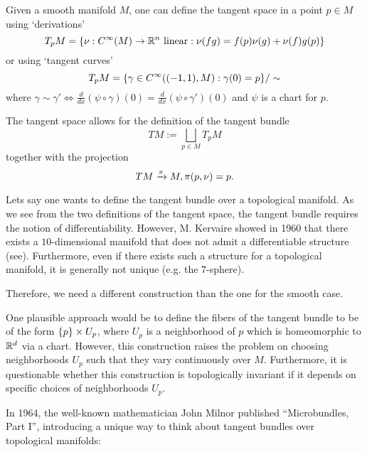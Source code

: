 \begin{myparagraph}
    
    Given a smooth manifold $M$,
    one can define the tangent space
    in a point $p \in M$ using `derivations'
    \[
        T_p M = \{\nu: C^\infty(M) \to \mathbb{R}^n \text{ linear}:\nu(fg)
        = f(p)\nu(g) + \nu(f)g(p)\}
    \]    
    or using `tangent curves'
    \[ T_p M = \{\gamma \in C^\infty((-1, 1), M):\gamma(0) = p \} / \sim \]
    where $\gamma \sim \gamma' \iff \frac{d}{dx}(\psi \circ \gamma)(0) = \frac{d}{dx}(\psi \circ \gamma')(0)$
    and $\psi$ is a chart for $p$.
    
    The tangent space allows for the definition of the tangent bundle
    \[ TM := \bigsqcup_{p \in M} T_p M\]
    together with the projection
    \[ TM \xrightarrow{\pi} M, \pi(p, \nu) = p. \]

    Lets say one wants to define the tangent bundle over a topological manifold.
    As we see from the two definitions of the tangent space,
    the tangent bundle requires the notion of differentiability.
    However, M. Kervaire showed in 1960 that there exists a $10$-dimensional manifold
    that does not admit a differentiable structure (see\cite{kervaire}).
    Furthermore, even if there exists such a structure for a topological manifold,
    it is generally not unique (e.g. the $7$-sphere\cite{milnor7sphere}).

    Therefore,
    we need a different construction than the one for the smooth case.
    
    One plausible approach would be to define the fibers of the tangent bundle
    to be of the form $\{p\} \times U_p$,
    where $U_p$ is a neighborhood of $p$ which is
    homeomorphic to $\mathbb{R}^d$ via a chart.
    However, this construction raises the problem
    on choosing neighborhoods $U_p$
    such that they vary continuously over $M$.
    Furthermore,
    it is questionable whether this construction is topologically
    invariant if it depends on specific choices of neighborhoods $U_p$.

    In 1964,
    the well-known mathematician John Milnor
    published ``Microbundles, Part I'',
    introducing a unique way to think
    about tangent bundles over topological manifolds:


\end{myparagraph}
